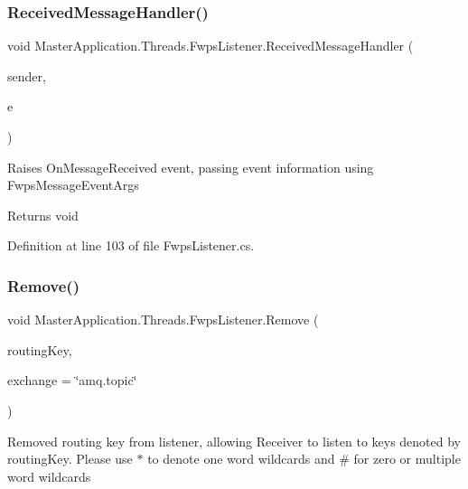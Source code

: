 \subsubsection{\texorpdfstring{Received\+Message\+Handler()}{ReceivedMessageHandler()}}
{\footnotesize\ttfamily void Master\+Application.\+Threads.\+Fwps\+Listener.\+Received\+Message\+Handler (\begin{DoxyParamCaption}\item[{object}]{sender,  }\item[{Basic\+Deliver\+Event\+Args}]{e }\end{DoxyParamCaption})\hspace{0.3cm}{\ttfamily [private]}}



Raises \textquotesingle{}On\+Message\+Received\textquotesingle{} event, passing event information using Fwps\+Message\+Event\+Args 

\begin{DoxyReturn}{Returns}
void
\end{DoxyReturn}


Definition at line 103 of file Fwps\+Listener.\+cs.

\mbox{\label{class_master_application_1_1_threads_1_1_fwps_listener_aee12307bd200ca163ed2d536db60b0bc}} 
\subsubsection{\texorpdfstring{Remove()}{Remove()}}
{\footnotesize\ttfamily void Master\+Application.\+Threads.\+Fwps\+Listener.\+Remove (\begin{DoxyParamCaption}\item[{string}]{routing\+Key,  }\item[{string}]{exchange = {\ttfamily \char`\"{}amq.topic\char`\"{}} }\end{DoxyParamCaption})}



Removed routing key from listener, allowing Receiver to listen to keys denoted by \textquotesingle{}routing\+Key\textquotesingle{}. Please use \textquotesingle{}$\ast$\textquotesingle{} to denote one word wildcards and \textquotesingle{}\#\textquotesingle{} for zero or multiple word wildcards 

